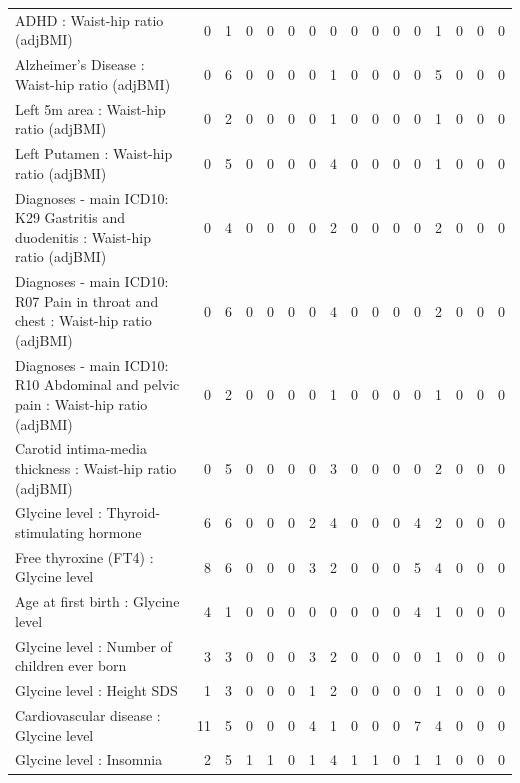 \begin{table}[ht]
\begin{tabular}{lrrrrrrrrrrrrrrr}
  ADHD : Waist-hip ratio (adjBMI) &   0 &   1 &   0 &   0 &   0 &   0 &   0 &   0 &   0 &   0 &   0 &   1 &   0 &   0 &   0 \\ 
  Alzheimer's Disease : Waist-hip ratio (adjBMI) &   0 &   6 &   0 &   0 &   0 &   0 &   1 &   0 &   0 &   0 &   0 &   5 &   0 &   0 &   0 \\ 
  Left 5m area : Waist-hip ratio (adjBMI) &   0 &   2 &   0 &   0 &   0 &   0 &   1 &   0 &   0 &   0 &   0 &   1 &   0 &   0 &   0 \\ 
  Left Putamen : Waist-hip ratio (adjBMI) &   0 &   5 &   0 &   0 &   0 &   0 &   4 &   0 &   0 &   0 &   0 &   1 &   0 &   0 &   0 \\ 
  Diagnoses - main ICD10: K29 Gastritis and duodenitis : Waist-hip ratio (adjBMI) &   0 &   4 &   0 &   0 &   0 &   0 &   2 &   0 &   0 &   0 &   0 &   2 &   0 &   0 &   0 \\ 
  Diagnoses - main ICD10: R07 Pain in throat and chest : Waist-hip ratio (adjBMI) &   0 &   6 &   0 &   0 &   0 &   0 &   4 &   0 &   0 &   0 &   0 &   2 &   0 &   0 &   0 \\ 
  Diagnoses - main ICD10: R10 Abdominal and pelvic pain : Waist-hip ratio (adjBMI) &   0 &   2 &   0 &   0 &   0 &   0 &   1 &   0 &   0 &   0 &   0 &   1 &   0 &   0 &   0 \\ 
  Carotid intima-media thickness : Waist-hip ratio (adjBMI) &   0 &   5 &   0 &   0 &   0 &   0 &   3 &   0 &   0 &   0 &   0 &   2 &   0 &   0 &   0 \\ 
  Glycine level  : Thyroid-stimulating hormone  &   6 &   6 &   0 &   0 &   0 &   2 &   4 &   0 &   0 &   0 &   4 &   2 &   0 &   0 &   0 \\ 
  Free thyroxine (FT4) : Glycine level  &   8 &   6 &   0 &   0 &   0 &   3 &   2 &   0 &   0 &   0 &   5 &   4 &   0 &   0 &   0 \\ 
  Age at first birth  : Glycine level  &   4 &   1 &   0 &   0 &   0 &   0 &   0 &   0 &   0 &   0 &   4 &   1 &   0 &   0 &   0 \\ 
  Glycine level  : Number of children ever born  &   3 &   3 &   0 &   0 &   0 &   3 &   2 &   0 &   0 &   0 &   0 &   1 &   0 &   0 &   0 \\ 
  Glycine level  : Height SDS &   1 &   3 &   0 &   0 &   0 &   1 &   2 &   0 &   0 &   0 &   0 &   1 &   0 &   0 &   0 \\ 
  Cardiovascular disease : Glycine level  &  11 &   5 &   0 &   0 &   0 &   4 &   1 &   0 &   0 &   0 &   7 &   4 &   0 &   0 &   0 \\ 
  Glycine level  : Insomnia &   2 &   5 &   1 &   1 &   0 &   1 &   4 &   1 &   1 &   0 &   1 &   1 &   0 &   0 &   0 \\ 

\end{tabular}
\end{table}
